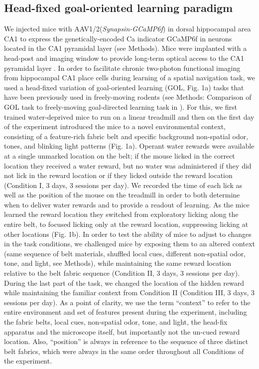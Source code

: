\subsection{Head-fixed goal-oriented learning paradigm}
We injected mice with AAV1/2(\emph{Synapsin-GCaMP6f}) in dorsal hippocampal area CA1 to express the genetically-encoded Ca indicator GCaMP6f \citep{Chen2013} in neurons located in the CA1 pyramidal layer (see Methods).  Mice were implanted with a head-post and imaging window to provide long-term optical access to the CA1 pyramidal layer \citep{Danielson2016b}\citep{Kaifosh2013}\citep{Lovett-Barron2014}.  In order to facilitate chronic two-photon functional imaging from hippocampal CA1 place cells \citep{Danielson2016b}\citep{Dombeck2010} during learning of a spatial navigation task, we used a head-fixed variation of goal-oriented learning \citep{Danielson2016b} (GOL, Fig. 1a) tasks that have been previously used in freely-moving rodents \citep{Dupret2010a} (see Methods: Comparison of GOL task to freely-moving goal-directed learning task in \citealt{Dupret2010a}).  For this, we first trained water-deprived mice to run on a linear treadmill \citep{Danielson2016a}\citep{Danielson2016b}\citep{Royer2012} and then on the first day of the experiment introduced the mice to a novel environmental context, consisting of a feature-rich fabric belt and specific background non-spatial odor, tones, and blinking light patterns (Fig. 1a). Operant water rewards were available at a single unmarked location on the belt; if the mouse licked in the correct location they received a water reward, but no water was administered if they did not lick in the reward location or if they licked outside the reward location (Condition I, 3 days, 3 sessions per day).  We recorded the time of each lick as well as the position of the mouse on the treadmill in order to both determine when to deliver water rewards and to provide a readout of learning. As the mice learned the reward location they switched from exploratory licking along the entire belt, to focused licking only at the reward location, suppressing licking at other locations (Fig. 1b). In order to test the ability of mice to adjust to changes in the task conditions, we challenged mice by exposing them to an altered context (same sequence of belt materials, shuffled local cues, different non-spatial odor, tone, and light, see Methods), while maintaining the same reward location relative to the belt fabric sequence (Condition II, 3 days, 3 sessions per day). During the last part of the task, we changed the location of the hidden reward while maintaining the familiar context from Condition II (Condition III, 3 days, 3 sessions per day). As a point of clarity, we use the term “context” to refer to the entire environment and set of features present during the experiment, including the fabric belts, local cues, non-spatial odor, tone, and light, the head-fix apparatus and the microscope itself, but importantly not the un-cued reward location. Also, “position” is always in reference to the sequence of three distinct belt fabrics, which were always in the same order throughout all Conditions of the experiment.


